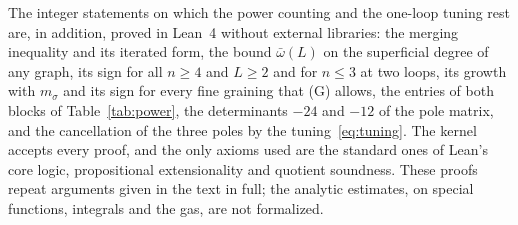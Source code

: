 \documentclass[a4paper,11pt]{article}
\begin{document}
The integer statements on which the power counting and the one-loop tuning rest are, in addition, proved in Lean~4 without external libraries: the merging inequality and its iterated form, the bound $\bar\omega(L)$ on the superficial degree of any graph, its sign for all $n\ge4$ and $L\ge2$ and for $n\le3$ at two loops, its growth with $m_\sigma$ and its sign for every fine graining that (G) allows, the entries of both blocks of Table~\ref{tab:power}, the determinants $-24$ and $-12$ of the pole matrix, and the cancellation of the three poles by the tuning~\eqref{eq:tuning}. The kernel accepts every proof, and the only axioms used are the standard ones of Lean's core logic, propositional extensionality and quotient soundness. These proofs repeat arguments given in the text in full; the analytic estimates, on special functions, integrals and the gas, are not formalized.
\end{document}

